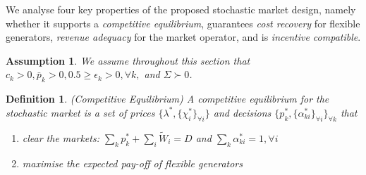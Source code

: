 \documentclass{article}
\newtheorem{definition}{Definition}
\newtheorem{assumption}{Assumption}
\begin{document}
We analyse four key properties of the proposed stochastic market design, namely whether it supports a \textit{competitive equilibrium}, guarantees \textit{cost recovery} for flexible generators, \textit{revenue adequacy} for the market operator, and is \textit{incentive compatible}.

\begin{assumption}
We assume throughout this section that $c_k > 0, \bar{p}_k > 0, 0.5 \ge \epsilon_k > 0, \forall k,$ and $\Sigma \succ 0$.
\end{assumption}

\begin{definition}
(Competitive Equilibrium) A competitive equilibrium for the stochastic market is a set of prices $\{\lambda^*, \{\chi_i^*\}_{\forall i}\}$ and decisions $\{p_k^*, \{\alpha_{ki}^*\}_{\forall i}\}_{\forall k}$ that\vspace{-5pt}
\begin{enumerate}
\item clear the markets: $\sum_k p_k^* + \sum_i \tilde{W}_i = D$ and $\sum_k \alpha_{ki}^* = 1, \forall i$\vspace{-5pt}
\item maximise the expected pay-off of flexible generators
\end{enumerate}
\end{definition}
\end{document}
